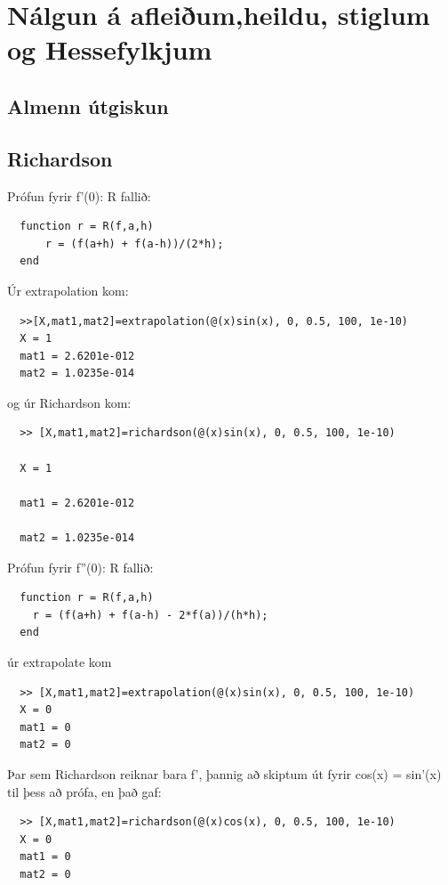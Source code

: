 \documentclass[a4]{article}
\begin{document}
\section{Nálgun á afleiðum,heildu, stiglum og Hessefylkjum}
\subsection{Almenn útgiskun}


\subsection{Richardson}
Prófun fyrir f'(0):
R fallið:
\begin{lstlisting}
  function r = R(f,a,h)
      r = (f(a+h) + f(a-h))/(2*h);
  end
\end{lstlisting}

Úr extrapolation kom:
\begin{lstlisting}
  >>[X,mat1,mat2]=extrapolation(@(x)sin(x), 0, 0.5, 100, 1e-10)
  X = 1 
  mat1 = 2.6201e-012
  mat2 = 1.0235e-014 
\end{lstlisting}

og úr Richardson kom:
\begin{lstlisting}
  >> [X,mat1,mat2]=richardson(@(x)sin(x), 0, 0.5, 100, 1e-10)

  X = 1

  mat1 = 2.6201e-012

  mat2 = 1.0235e-014
\end{lstlisting}
Prófun fyrir f''(0):
R fallið:
\begin{lstlisting}
  function r = R(f,a,h)
    r = (f(a+h) + f(a-h) - 2*f(a))/(h*h);
  end
\end{lstlisting}

úr extrapolate kom
\begin{lstlisting}
  >> [X,mat1,mat2]=extrapolation(@(x)sin(x), 0, 0.5, 100, 1e-10)
  X = 0
  mat1 = 0
  mat2 = 0
\end{lstlisting}

Þar sem Richardson reiknar bara f', þannig að skiptum út fyrir cos(x) = sin'(x) til þess að prófa, en það gaf:
\begin{lstlisting}
  >> [X,mat1,mat2]=richardson(@(x)cos(x), 0, 0.5, 100, 1e-10)
  X = 0
  mat1 = 0
  mat2 = 0
\end{lstlisting}
\end{document}
